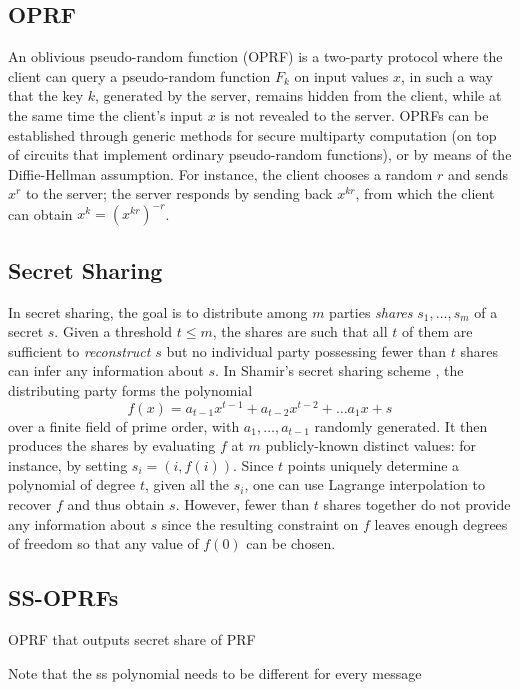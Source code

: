 \subsection{OPRF}

An oblivious pseudo-random function (OPRF) \cite{OPRF,OT_Ext} is
a two-party protocol where the client can query a pseudo-random function
$F_{k}$ on input values $x$, in such a way that the key $k$, generated
by the server, remains hidden from the client, while at the same time
the client's input $x$ is not revealed to the server. OPRFs can be
established through generic methods for secure multiparty computation
(on top of circuits that implement ordinary pseudo-random functions),
or by means of the Diffie-Hellman assumption. For instance, the client
chooses a random $r$ and sends $x^{r}$ to the server; the server
responds by sending back $x^{kr}$, from which the client can obtain
$x^{k}=(x^{kr})^{-r}$.

\subsection{Secret Sharing}

In secret sharing, the goal is to distribute among $m$ parties \emph{shares
}$s_{1},\ldots,s_{m}$ of a secret $s$. Given a threshold $t\leq m$,
the shares are such that all $t$ of them are sufficient to \emph{reconstruct
}$s$ but no individual party possessing fewer than $t$ shares can
infer any information about $s$. In Shamir's secret sharing scheme
\cite{Shamir}, the distributing party forms the polynomial 
\[
f(x)=a_{t-1}x^{t-1}+a_{t-2}x^{t-2}+\ldots a_{1}x+s
\]
over a finite field of prime order, with $a_{1},\ldots,a_{t-1}$ randomly
generated. It then produces the shares by evaluating $f$ at $m$
publicly-known distinct values: for instance, by setting $s_{i}=(i,f(i))$.
Since $t$ points uniquely determine a polynomial of degree $t$,
given all the $s_{i}$, one can use Lagrange interpolation to recover
$f$ and thus obtain $s$. However, fewer than $t$ shares together
do not provide any information about $s$ since the resulting constraint
on $f$ leaves enough degrees of freedom so that any value of $f(0)$
can be chosen.

\subsection{SS-OPRFs}

OPRF that outputs secret share of PRF

Note that the ss polynomial needs to be different for every message

